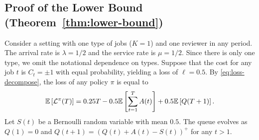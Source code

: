 \subsection{Proof of the Lower Bound (Theorem~\ref{thm:lower-bound})}\label{app:lower-bound}
Consider a setting with one type of jobs ($K = 1$) and one reviewer in any period. The arrival rate is $\lambda = 1 / 2$ and the service rate is $\mu= 1/2$. Since there is only one type, we omit the notational dependence on types. Suppose that the cost for any job $t$ is $C_t = \pm 1$ with equal probability, yielding a loss of $\ell = 0.5$. By \eqref{eq:loss-decompose}, the loss of any policy $\pi$ is equal to 
\begin{equation}\label{eq:loss-example}
\mathbb E\left[\mathcal{L}^{\pi}(T)\right] = 0.25T - 0.5\mathbb E\left[\sum_{t=1}^T A(t)\right] + 0.5\mathbb E\left[Q(T+1)\right].
\end{equation} 
Let $S(t)$ be a Bernoulli random variable with mean $0.5$. The queue evolves as $Q(1) = 0$ and $Q(t+1) = (Q(t) + A(t) - S(t))^+$ for any $t > 1$. 

